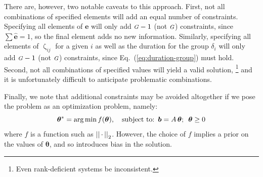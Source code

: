 \documentclass[10pt]{article}
\numberwithin{equation}{section}
\renewcommand{\zeta}{\upzeta}
\newcommand{\G}{{\mbox{\footnotesize{\textit{G}}}}}
\newcommand{\eq}[1]{Eq.~(\ref{#1})}
\begin{document}
There are, however, two notable caveats to this approach.
First, not all combinations of specified elements will add an equal number of constraints.
Specifying all elements of $\bm{e}$
will only add $\G-1$ (not $\G$) constraints,
since $\sum \bm{\hat{e}} = 1$, so the final element adds no new information.
Similarly, specifying all elements of $\zeta_{ij}$ for a given $i$
as well as the duration for the group $\delta_i$
will only add $\G-1$ (not $\G$) constraints,
since \eq{eq:duration-group} must hold.
Second, not all combinations of specified values will yield a valid solution,%
\footnote{Even rank-deficient systems be inconsistent.}
and it is unfortunately difficult to anticipate problematic combinations.
\par
Finally, we note that additional constraints may be avoided altogether if we pose the problem
as an optimization problem, namely:
\begin{equation}\label{eq:system-optimize}
\bm{\theta}^{*} = {\arg \min}
  \thinspace f(\bm{\theta}),
  \quad \textrm{subject to:}
  \enspace\bm{b} = A\thinspace\bm{\theta};
  \enspace\bm{\theta} \ge 0
\end{equation}
where $f$ is a function such as ${\left|\left| \thinspace\cdot\thinspace \right|\right|}_2$.
However, the choice of $f$ implies a prior on the values of $\bm{\theta}$,
and so introduces bias in the solution.
\end{document}
